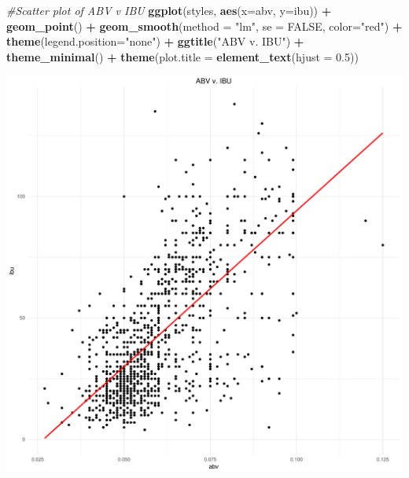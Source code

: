 \documentclass[]{article}
\newenvironment{Shaded}{\begin{snugshade}}{\end{snugshade}}
\newcommand{\KeywordTok}[1]{\textcolor[rgb]{0.13,0.29,0.53}{\textbf{#1}}}
\newcommand{\DataTypeTok}[1]{\textcolor[rgb]{0.13,0.29,0.53}{#1}}
\newcommand{\FloatTok}[1]{\textcolor[rgb]{0.00,0.00,0.81}{#1}}
\newcommand{\StringTok}[1]{\textcolor[rgb]{0.31,0.60,0.02}{#1}}
\newcommand{\CommentTok}[1]{\textcolor[rgb]{0.56,0.35,0.01}{\textit{#1}}}
\newcommand{\OtherTok}[1]{\textcolor[rgb]{0.56,0.35,0.01}{#1}}
\newcommand{\OperatorTok}[1]{\textcolor[rgb]{0.81,0.36,0.00}{\textbf{#1}}}
\newcommand{\NormalTok}[1]{#1}
\begin{document}
\begin{Shaded}
\begin{Highlighting}[]
\CommentTok{#Scatter plot of ABV v IBU}
\KeywordTok{ggplot}\NormalTok{(styles, }\KeywordTok{aes}\NormalTok{(}\DataTypeTok{x=}\NormalTok{abv, }\DataTypeTok{y=}\NormalTok{ibu)) }\OperatorTok{+}
\StringTok{  }\KeywordTok{geom_point}\NormalTok{() }\OperatorTok{+}
\StringTok{  }\KeywordTok{geom_smooth}\NormalTok{(}\DataTypeTok{method =} \StringTok{"lm"}\NormalTok{, }\DataTypeTok{se =} \OtherTok{FALSE}\NormalTok{, }\DataTypeTok{color=}\StringTok{"red"}\NormalTok{) }\OperatorTok{+}
\StringTok{  }\KeywordTok{theme}\NormalTok{(}\DataTypeTok{legend.position=}\StringTok{"none"}\NormalTok{) }\OperatorTok{+}
\StringTok{  }\KeywordTok{ggtitle}\NormalTok{(}\StringTok{"ABV v. IBU"}\NormalTok{) }\OperatorTok{+}
\StringTok{  }\KeywordTok{theme_minimal}\NormalTok{()  }\OperatorTok{+}
\StringTok{  }\KeywordTok{theme}\NormalTok{(}\DataTypeTok{plot.title =} \KeywordTok{element_text}\NormalTok{(}\DataTypeTok{hjust =} \FloatTok{0.5}\NormalTok{))}
\end{Highlighting}
\end{Shaded}

\begin{center}\includegraphics{Analysis_Final_files/figure-latex/unnamed-chunk-22-1} \end{center}
\end{document}
